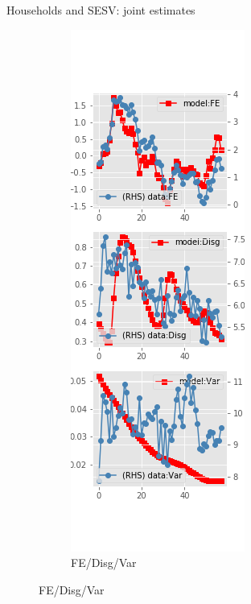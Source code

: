 \documentclass{beamer}
\begin{document}
\begin{frame}{Households and SESV: joint estimates}
\begin{figure}[ht]
\begin{subfigure}[b]{0.2\textwidth}
		\end{subfigure}
		\hfill
		\begin{subfigure}[b]{0.2\textwidth}
			\caption{FE/Disg/Var}
			\includegraphics[width=\textwidth, height = 0.8\textheight]{figuresDraft/sce_se_est_sv_joint_diag2.png}
		\end{subfigure}
	\end{figure}
\end{frame}
\end{document}
